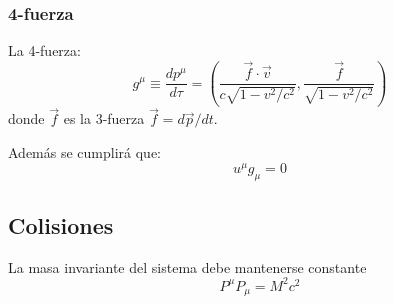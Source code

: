 \documentclass[]{report}
\numberwithin{equation}{section}
\newcommand{\0}{\textcolor{gray}{0}}
\begin{document}
\subsubsection{4-fuerza}
\phantom{.}

La 4-fuerza:
\begin{equation}
	g^\mu \equiv \frac{dp^\mu}{d\tau} = \left(\dfrac{\vec{f}\cdot\vec{v}}{c\sqrt{1 - v^2/c^2}}, \dfrac{\vec{f}}{\sqrt{1 - v^2/c^2}} \right) 
\end{equation}
donde \(\vec{f}\) es la 3-fuerza \(\vec{f}=d\vec{p}/dt\).

Además se cumplirá que:
\begin{equation}
	u^\mu g_\mu = 0
\end{equation}

\subsection{Colisiones}
La masa invariante del sistema debe mantenerse constante
\begin{equation}
	P^\mu P_\mu = M^2c^2
\end{equation}
\end{document}
